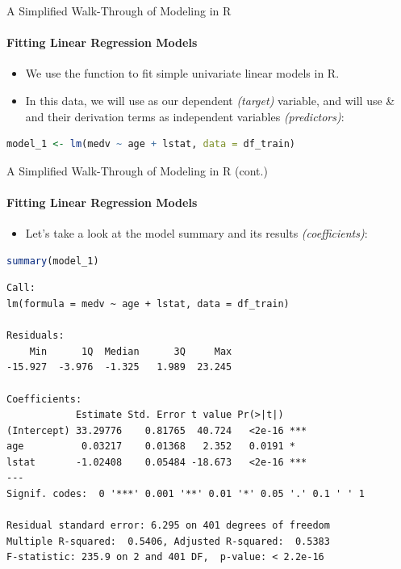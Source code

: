 \begin{frame}[fragile]{A Simplified Walk-Through of Modeling in R}
\framesubtitle{Fitting Linear Regression Models}
\begin{itemize}
  \item We use the  function to fit simple univariate linear models in R.
  \item In this data, we will use  as our dependent \textit{(target)} variable, and will use  \&  and their derivation terms as independent variables \textit{(predictors)}:
\end{itemize}
\begin{lstlisting}[language=R]
model_1 <- lm(medv ~ age + lstat, data = df_train)
\end{lstlisting}
\end{frame}

\begin{frame}[fragile]{A Simplified Walk-Through of Modeling in R (cont.)}
\framesubtitle{Fitting Linear Regression Models}
\begin{itemize}
  \item Let’s take a look at the model summary and its results \textit{(coefficients)}:
\end{itemize}
\begin{lstlisting}[language=R]
summary(model_1)
\end{lstlisting}
\begin{lstlisting}[style=output,basicstyle=\ttfamily\tiny\color{black!75}]
Call:
lm(formula = medv ~ age + lstat, data = df_train)

Residuals:
    Min      1Q  Median      3Q     Max 
-15.927  -3.976  -1.325   1.989  23.245 

Coefficients:
            Estimate Std. Error t value Pr(>|t|)    
(Intercept) 33.29776    0.81765  40.724   <2e-16 ***
age          0.03217    0.01368   2.352   0.0191 *  
lstat       -1.02408    0.05484 -18.673   <2e-16 ***
---
Signif. codes:  0 '***' 0.001 '**' 0.01 '*' 0.05 '.' 0.1 ' ' 1

Residual standard error: 6.295 on 401 degrees of freedom
Multiple R-squared:  0.5406, Adjusted R-squared:  0.5383 
F-statistic: 235.9 on 2 and 401 DF,  p-value: < 2.2e-16
\end{lstlisting}
\end{frame}


